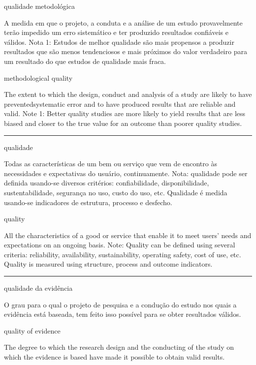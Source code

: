 \documentclass[
  openany]{book}
\begin{document}
qualidade metodológica

A medida em que o projeto, a conduta e a análise de um estudo provavelmente terão impedido um erro sistemático e ter produzido resultados confiáveis e válidos. Nota 1: Estudos de melhor qualidade são mais propensos a produzir resultados que são menos tendenciosos e mais próximos do valor verdadeiro para um resultado do que estudos de qualidade mais fraca.

methodological quality

The extent to which the design, conduct and analysis of a study are likely to have preventedsystematic error and to have produced results that are reliable and valid. Note 1: Better quality studies are more likely to yield results that are less biased and closer to the true value for an outcome than poorer quality studies.

\begin{center}\rule{0.5\linewidth}{0.5pt}\end{center}

qualidade

Todas as características de um bem ou serviço que vem de encontro às necessidades e expectativas do usuário, continuamente. Nota: qualidade pode ser definida usando-se diversos critérios: confiabilidade, disponibilidade, sustentabilidade, segurança no uso, custo do uso, etc. Qualidade é medida usando-se indicadores de estrutura, processo e desfecho.

quality

All the characteristics of a good or service that enable it to meet users' needs and expectations on an ongoing basis. Note: Quality can be defined using several criteria: reliability, availability, sustainability, operating safety, cost of use, etc. Quality is measured using structure, process and outcome indicators.

\begin{center}\rule{0.5\linewidth}{0.5pt}\end{center}

qualidade da evidência

O grau para o qual o projeto de pesquisa e a condução do estudo nos quais a evidência está baseada, tem feito isso possível para se obter resultados válidos.

quality of evidence

The degree to which the research design and the conducting of the study on which the evidence is based have made it possible to obtain valid results.
\end{document}
